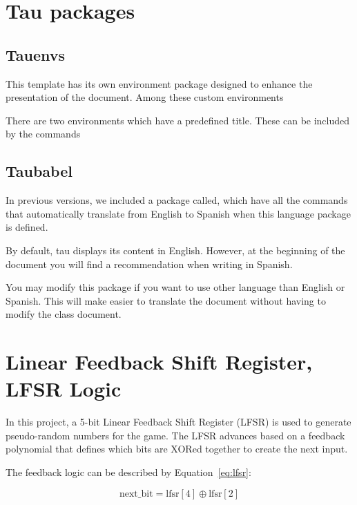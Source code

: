 \documentclass[10pt,a4paper,twocolumn,twoside]{tau-class/tau}
\begin{document}
		
\section{Tau packages}

    \subsection{Tauenvs}
	
        This template has its own environment package designed to enhance the presentation of the document. Among these custom environments
		
        There are two environments which have a predefined title. These can be included by the commands
		
    \subsection{Taubabel}

        In previous versions, we included a package called, which have all the commands that automatically translate from English to Spanish when this language package is defined. 
        
        By default, tau displays its content in English. However, at the beginning of the document you will find a recommendation when writing in Spanish. 
		
       You may modify this package if you want to use other language than English or Spanish. This will make easier to translate the document without having to modify the class document.


\newpage

\section{Linear Feedback Shift Register, LFSR Logic }

    In this project, a 5-bit Linear Feedback Shift Register (LFSR) is used to generate pseudo-random numbers for the game. The LFSR advances based on a feedback polynomial that defines which bits are XORed together to create the next input.

    The feedback logic can be described by Equation~\ref{eq:lfsr}:
    
    \begin{equation} \label{eq:lfsr}
        \text{next\_bit} = \text{lfsr}[4] \oplus \text{lfsr}[2]
    \end{equation}
\end{document}

